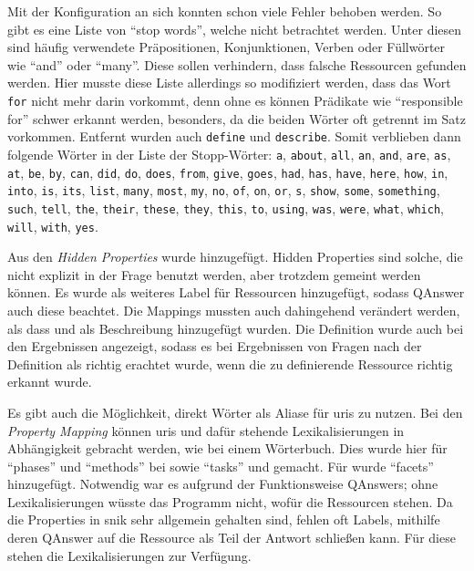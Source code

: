 Mit der Konfiguration an sich konnten schon viele Fehler behoben werden.
So gibt es eine Liste von \enquote{stop words}, welche nicht betrachtet werden.
Unter diesen sind häufig verwendete Präpositionen, Konjunktionen, Verben oder Füllwörter wie \enquote{and} oder \enquote{many}.
Diese sollen verhindern, dass falsche Ressourcen gefunden werden.
Hier musste diese Liste allerdings so modifiziert werden, dass das Wort \texttt{for} nicht mehr darin vorkommt, denn ohne es können Prädikate wie \enquote{responsible for} schwer erkannt werden,
besonders, da die beiden Wörter oft getrennt im Satz vorkommen.
Entfernt wurden auch \texttt{define} und \texttt{describe}.
Somit verblieben dann folgende Wörter in der Liste der Stopp-Wörter:
\texttt{a}, \texttt{about}, \texttt{all}, \texttt{an}, \texttt{and}, \texttt{are}, \texttt{as}, \texttt{at}, \texttt{be}, \texttt{by}, \texttt{can}, \texttt{did}, \texttt{do}, \texttt{does}, \texttt{from}, \texttt{give}, \texttt{goes}, \texttt{had}, \texttt{has}, \texttt{have}, \texttt{here}, \texttt{how}, \texttt{in}, \texttt{into}, \texttt{is}, \texttt{its}, \texttt{list}, \texttt{many}, \texttt{most}, \texttt{my}, \texttt{no}, \texttt{of}, \texttt{on}, \texttt{or}, \texttt{s}, \texttt{show}, \texttt{some}, \texttt{something}, \texttt{such}, \texttt{tell}, \texttt{the}, \texttt{their}, \texttt{these}, \texttt{they}, \texttt{this}, \texttt{to}, \texttt{using}, \texttt{was}, \texttt{were}, \texttt{what}, \texttt{which}, \texttt{will}, \texttt{with}, \texttt{yes}.

Aus den \emph{Hidden Properties} wurde  hinzugefügt.
Hidden Properties sind solche, die nicht explizit in der Frage benutzt werden, aber trotzdem gemeint werden können.
Es wurde  als weiteres Label für Ressourcen hinzugefügt, sodass QAnswer auch diese beachtet.
Die Mappings mussten auch dahingehend verändert werden, als dass 
und  als Beschreibung hinzugefügt wurden.
Die Definition wurde auch bei den Ergebnissen angezeigt, sodass es bei Ergebnissen von Fragen nach der Definition als richtig erachtet wurde, wenn die zu definierende Ressource richtig erkannt wurde.

Es gibt auch die Möglichkeit, direkt Wörter als Aliase für \acp{uri} zu nutzen.
Bei den \emph{Property Mapping} können \acp{uri} und dafür stehende Lexikalisierungen in Abhängigkeit gebracht werden, wie bei einem Wörterbuch.
Dies wurde hier für \enquote{phases} und \enquote{methods} bei  sowie \enquote{tasks} und  gemacht.
Für  wurde \enquote{facets} hinzugefügt.
Notwendig war es aufgrund der Funktionsweise QAnswers; ohne Lexikalisierungen wüsste das Programm nicht, wofür die Ressourcen stehen.
Da die Properties in \ac{snik} sehr allgemein gehalten sind, fehlen oft Labels, mithilfe deren QAnswer auf die Ressource als Teil der Antwort schließen kann.
Für diese stehen die Lexikalisierungen zur Verfügung.

